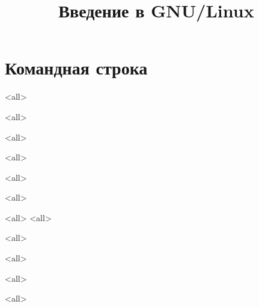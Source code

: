 

\title{Введение в GNU/Linux}





\begin{frame}
	\frametitle{}
	\titlepage
	\vspace{-0.5cm}
	\begin{center}
	\end{center}
\end{frame}
\begin{frame}
	\tableofcontents
\end{frame}

\section{Командная строка}

\mode<all>{}

\mode<all>{}

\mode<all>{}

\mode<all>{}

\mode<all>{}

\mode<all>{}

\mode<all>{}
\mode<all>{}

\mode<all>{}

\mode<all>{}

\mode<all>{}

\mode<all>{}


